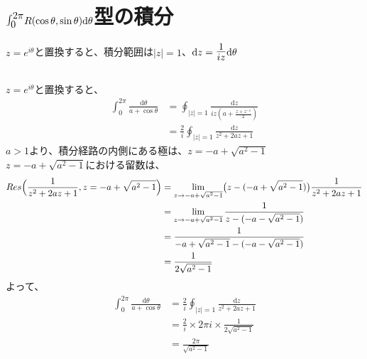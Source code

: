 \documentclass[dvipdfmx,a4paper]{jsarticle}
\begin{document}
\section{$\mbox{\Large$\int^{2\pi}_0$}R(\cos{\theta},\sin{\theta})\mathrm{d}\theta$型の積分}
$z = e^{i\theta}$と置換すると、積分範囲は$|z|=1$、$\mathrm{d}z = \mbox{\Large$\frac{1}{iz}$}\mathrm{d}\theta$
\subsection{}
$z = e^{i\theta}$と置換すると、
\begin{align*}
\int_0^{2\pi}\frac{\mathrm{d}\theta}{a+\cos{\theta}} &= \oint_{|z|=1}\frac{\mathrm{d}z}{iz(a+\frac{z + z^{-1}}{2})}\\
&= \frac{2}{i}\oint_{|z|=1}\frac{\mathrm{d}z}{z^2 +2az + 1}
\end{align*}
$a>1$より、積分経路の内側にある極は、$z = - a + \sqrt{a^2 -1}$\\
$z = - a + \sqrt{a^2 -1}$における留数は、
\begin{align*}
Res\Bigl(\frac{1}{z^2 +2az + 1}, z = - a + \sqrt{a^2 -1}\Bigr) &= \lim_{z \to - a + \sqrt{a^2 -1}}\bigl(z - (- a + \sqrt{a^2 -1})\bigr)\frac{1}{z^2 +2az + 1}\\
&= \lim_{z \to - a + \sqrt{a^2 -1}}\frac{1}{z - (- a - \sqrt{a^2 -1})}\\
&=\frac{1}{- a + \sqrt{a^2 -1} - (- a - \sqrt{a^2 -1})}\\
&= \frac{1}{2\sqrt{a^2 -1}}
\end{align*}
よって、
\begin{align*}
\int_0^{2\pi}\frac{\mathrm{d}\theta}{a+\cos{\theta}} &= \frac{2}{i}\oint_{|z|=1}\frac{\mathrm{d}z}{z^2 +2az + 1}\\
&= \frac{2}{i}\times 2\pi i\times\frac{1}{2\sqrt{a^2 -1}}\\
&= \frac{2\pi}{\sqrt{a^2 -1}}
\end{align*}
\\

\end{document}
